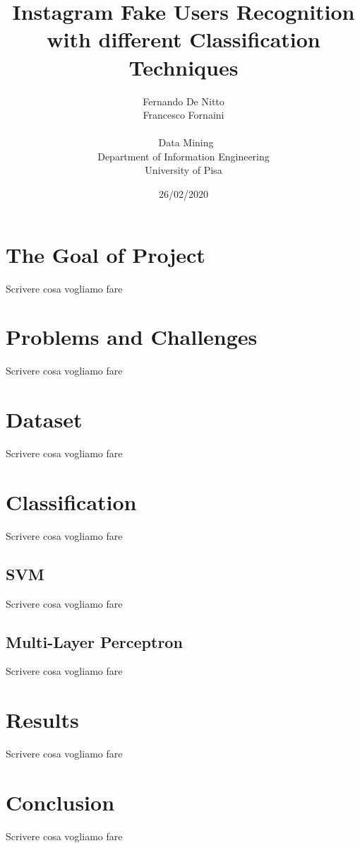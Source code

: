 \documentclass{article}
\title{Instagram Fake Users Recognition with different Classification Techniques}
\date{26/02/2020}
\author{Fernando De Nitto\\Francesco Fornaini\\\\\ Data Mining \\ Department of Information Engineering\\ University of Pisa\\}
\begin{document}
\maketitle


\section{The Goal of Project}
Scrivere cosa vogliamo fare

\section{Problems and Challenges}
Scrivere cosa vogliamo fare


\section{Dataset}
Scrivere cosa vogliamo fare


\section{Classification}
Scrivere cosa vogliamo fare

\subsection{SVM}
Scrivere cosa vogliamo fare

\subsection{Multi-Layer Perceptron}
Scrivere cosa vogliamo fare

\section{Results}
Scrivere cosa vogliamo fare

\section{Conclusion}
Scrivere cosa vogliamo fare
\end{document}
